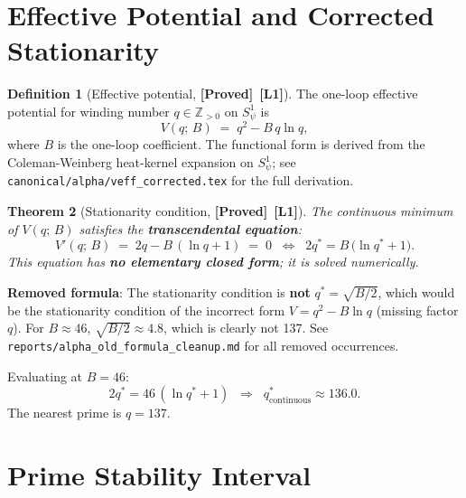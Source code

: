 \documentclass[12pt,a4paper]{article}
\newtheorem{theorem}{Theorem}[section]
\theoremstyle{definition}
\newtheorem{definition}[theorem]{Definition}
\theoremstyle{remark}
\newcommand{\ZZ}{\mathbb{Z}}
\newcommand{\PROVED}{\textbf{[Proved]}}
\newcommand{\Lone}{\textbf{[L1]}}
\begin{document}
\section{Effective Potential and Corrected Stationarity}
\label{sec:mpat:Veff}

\begin{definition}[Effective potential, \PROVED\ \Lone]
\label{def:mpat:Veff}
The one-loop effective potential for winding number $q \in \ZZ_{>0}$ on
$S^1_\psi$ is
\begin{equation}
  V(q;\,B) \;=\; q^2 - B\,q\ln q,
  \label{eq:mpat:Veff}
\end{equation}
where $B$ is the one-loop coefficient.  The functional form is derived from the
Coleman-Weinberg heat-kernel expansion on $S^1_\psi$; see
\texttt{canonical/alpha/veff\_corrected.tex} for the full derivation.
\end{definition}

\begin{theorem}[Stationarity condition, \PROVED\ \Lone]
\label{thm:mpat:stationary}
The continuous minimum of $V(q;\,B)$ satisfies the \textbf{transcendental equation}:
\begin{equation}
  V'(q;\,B)
  \;=\; 2q - B\,(\ln q + 1) \;=\; 0
  \;\;\Longleftrightarrow\;\;
  \boxed{2q^* = B\,\bigl(\ln q^* + 1\bigr).}
  \label{eq:mpat:stationary}
\end{equation}
This equation has \textbf{no elementary closed form}; it is solved numerically.
\end{theorem}

\begin{warnbox}
\textbf{Removed formula}:
The stationarity condition is \textbf{not}
$q^* = \sqrt{B/2}$, which would be the stationarity condition of the incorrect
form $V = q^2 - B\ln q$ (missing factor $q$).  For $B \approx 46$,
$\sqrt{B/2} \approx 4.8$, which is clearly not 137.
See \texttt{reports/alpha\_old\_formula\_cleanup.md} for all removed occurrences.
\end{warnbox}

Evaluating at $B = 46$:
\begin{equation}
  2q^* = 46\,(\ln q^* + 1)
  \;\;\Longrightarrow\;\;
  q^*_{\mathrm{continuous}} \approx 136.0.
  \label{eq:mpat:stat46}
\end{equation}
The nearest prime is $q = 137$.

\section{Prime Stability Interval}
\label{sec:mpat:interval}
\end{document}
